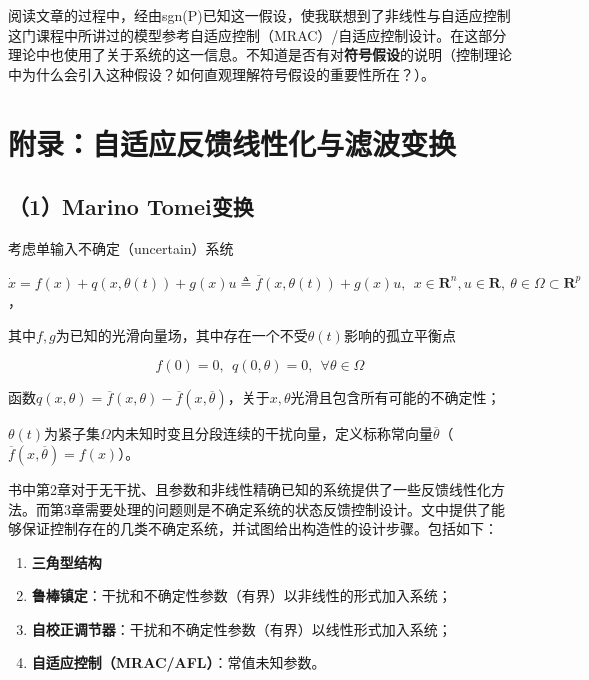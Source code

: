 \documentclass[
  12pt,
  a4paper
]{article}
\begin{document}
阅读文章的过程中，经由sgn(P)已知这一假设，使我联想到了非线性与自适应控制这门课程中所讲过的模型参考自适应控制（MRAC）/自适应控制设计。在这部分理论中也使用了关于系统的这一信息。不知道是否有对\textbf{符号假设}的说明（控制理论中为什么会引入这种假设？如何直观理解符号假设的重要性所在？）。

\section{附录：自适应反馈线性化与滤波变换}\label{ux9644ux5f55ux81eaux9002ux5e94ux53cdux9988ux7ebfux6027ux5316ux4e0eux6ee4ux6ce2ux53d8ux6362}

\subsection{（1）Marino Tomei变换}\label{marino-tomeiux53d8ux6362}

考虑单输入不确定（uncertain）系统

\(\dot{x} = f(x) + q\left( x,\theta(t) \right) + g(x)u \triangleq \overline{f}\left( x,\theta(t) \right) + g(x)u,\ \ x \in \mathbf{R}^{n},u \in \mathbf{R},\ \theta \in \Omega \subset \mathbf{R}^{p}\)，

其中\(f,g\)为已知的光滑向量场，其中存在一个不受\(\theta(t)\)影响的孤立平衡点

\[f(0) = 0,\ \ q(0,\theta) = 0,\ \ \forall\theta \in \Omega\]

函数\(q(x,\theta) = \overline{f}(x,\theta) - \overline{f}(x,\overline{\theta})\)，关于\(x,\theta\)光滑且包含所有可能的不确定性；

\(\theta(t)\)为紧子集\(\Omega\)内未知时变且分段连续的干扰向量，定义标称常向量\(\overline{\theta}\)（\(\overline{f}\left( x,\overline{\theta} \right) = f(x)\)）。

书中第2章对于无干扰、且参数和非线性精确已知的系统提供了一些反馈线性化方法。而第3章需要处理的问题则是不确定系统的状态反馈控制设计。文中提供了能够保证控制存在的几类不确定系统，并试图给出构造性的设计步骤。包括如下：

\begin{enumerate}
\def\labelenumi{\arabic{enumi}.}
\item
  \textbf{三角型结构}
\item
  \textbf{鲁棒镇定}：干扰和不确定性参数（有界）以非线性的形式加入系统；
\item
  \textbf{自校正调节器}：干扰和不确定性参数（有界）以线性形式加入系统；
\item
  \textbf{自适应控制（MRAC/AFL）}：常值未知参数。
\end{enumerate}
\end{document}

